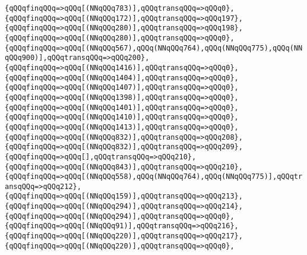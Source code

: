 \verb|{qQQqfinqQQq=>qQQq[(NNqQQq783)],qQQqtransqQQq=>qQQq0},|\newline
\verb|{qQQqfinqQQq=>qQQq[(NNqQQq172)],qQQqtransqQQq=>qQQq197},|\newline
\verb|{qQQqfinqQQq=>qQQq[(NNqQQq280)],qQQqtransqQQq=>qQQq198},|\newline
\verb|{qQQqfinqQQq=>qQQq[(NNqQQq280)],qQQqtransqQQq=>qQQq0},|\newline
\verb|{qQQqfinqQQq=>qQQq[(NNqQQq567),qQQq(NNqQQq764),qQQq(NNqQQq775),qQQq(NNqQQq900)],qQQqtransqQQq=>qQQq200},|\newline
\verb|{qQQqfinqQQq=>qQQq[(NNqQQq1416)],qQQqtransqQQq=>qQQq0},|\newline
\verb|{qQQqfinqQQq=>qQQq[(NNqQQq1404)],qQQqtransqQQq=>qQQq0},|\newline
\verb|{qQQqfinqQQq=>qQQq[(NNqQQq1407)],qQQqtransqQQq=>qQQq0},|\newline
\verb|{qQQqfinqQQq=>qQQq[(NNqQQq1398)],qQQqtransqQQq=>qQQq0},|\newline
\verb|{qQQqfinqQQq=>qQQq[(NNqQQq1401)],qQQqtransqQQq=>qQQq0},|\newline
\verb|{qQQqfinqQQq=>qQQq[(NNqQQq1410)],qQQqtransqQQq=>qQQq0},|\newline
\verb|{qQQqfinqQQq=>qQQq[(NNqQQq1413)],qQQqtransqQQq=>qQQq0},|\newline
\verb|{qQQqfinqQQq=>qQQq[(NNqQQq832)],qQQqtransqQQq=>qQQq208},|\newline
\verb|{qQQqfinqQQq=>qQQq[(NNqQQq832)],qQQqtransqQQq=>qQQq209},|\newline
\verb|{qQQqfinqQQq=>qQQq[],qQQqtransqQQq=>qQQq210},|\newline
\verb|{qQQqfinqQQq=>qQQq[(NNqQQq843)],qQQqtransqQQq=>qQQq210},|\newline
\verb|{qQQqfinqQQq=>qQQq[(NNqQQq558),qQQq(NNqQQq764),qQQq(NNqQQq775)],qQQqtransqQQq=>qQQq212},|\newline
\verb|{qQQqfinqQQq=>qQQq[(NNqQQq159)],qQQqtransqQQq=>qQQq213},|\newline
\verb|{qQQqfinqQQq=>qQQq[(NNqQQq294)],qQQqtransqQQq=>qQQq214},|\newline
\verb|{qQQqfinqQQq=>qQQq[(NNqQQq294)],qQQqtransqQQq=>qQQq0},|\newline
\verb|{qQQqfinqQQq=>qQQq[(NNqQQq91)],qQQqtransqQQq=>qQQq216},|\newline
\verb|{qQQqfinqQQq=>qQQq[(NNqQQq220)],qQQqtransqQQq=>qQQq217},|\newline
\verb|{qQQqfinqQQq=>qQQq[(NNqQQq220)],qQQqtransqQQq=>qQQq0},|\newline
